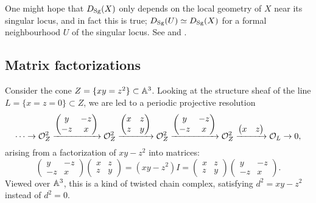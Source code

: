 One might hope that $D_{\mathrm{Sg}}(X)$ only depends on the local geometry of $X$ near
its singular locus, and in fact this is true; $D_{\mathrm{Sg}}(U)\simeq D_{\mathrm{Sg}}(X)$ for a
formal neighbourhood $U$ of the singular locus. See
\cite[Prop~1.14]{OrlovSingularities} and \cite[\S6]{Shipman}.

\subsection{Matrix factorizations}

Consider the cone $Z=\{xy=z^2\}\subset\mathbb{A}^3$. Looking at the structure sheaf of
the line $L=\{x=z=0\}\subset Z$, we are led to a periodic projective resolution
\begin{equation}\label{eqn:coneMF}
    \cdots \to
    \mathcal{O}_Z^2 \xrightarrow{\begin{pmatrix}
        y & -z \\ -z & x
    \end{pmatrix}}
    \mathcal{O}_Z^2 \xrightarrow{\begin{pmatrix}
        x & z \\ z & y
    \end{pmatrix}}
    \mathcal{O}_Z^2 \xrightarrow{\begin{pmatrix}
        y & -z \\ -z & x
    \end{pmatrix}}
    \mathcal{O}_Z^2 \xrightarrow{\begin{pmatrix}
        x & z
    \end{pmatrix}}
    \mathcal{O}_L\to0,
\end{equation}
arising from a factorization of $xy-z^2$ into matrices:
\begin{equation*}
    \begin{pmatrix}
        y & -z \\ -z & x
    \end{pmatrix}
    \begin{pmatrix}
        x & z \\ z & y
    \end{pmatrix}
        = (xy-z^2)I =
    \begin{pmatrix}
        x & z \\ z & y
    \end{pmatrix}
    \begin{pmatrix}
        y & -z \\ -z & x
    \end{pmatrix}.
\end{equation*}
Viewed over $\mathbb{A}^3$, this is a kind of twisted chain complex, satisfying
$d^2=xy-z^2$ instead of $d^2=0$.

